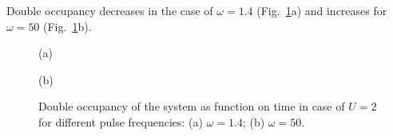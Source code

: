 Double occupancy decreases in the case of $\omega=1.4$ (Fig.~\ref{fig:docc_time_FS}a) and increases for $\omega=50$ (Fig.~\ref{fig:docc_time_FS}b).
\begin{figure}[h!]
\begin{minipage}[h]{0.5\linewidth}
 (a) \\
\end{minipage}
\hfill
\begin{minipage}[h]{0.5\linewidth}
 (b) \\
\end{minipage}
\caption{Double occupancy of the system as function on time in case of $U=2$ for different pulse frequencies: (a) $\omega=1.4$; (b) $\omega=50$.}
\label{fig:docc_time_FS}
\end{figure}

